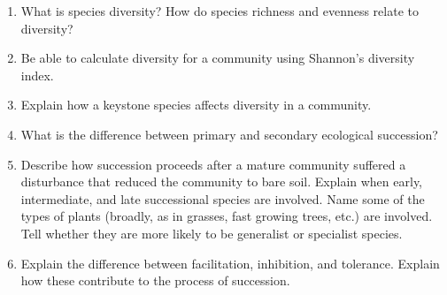 \documentclass[letterpaper]{tufte-handout}
\begin{document}
\begin{enumerate}

	\item What is species diversity? How do species richness and evenness relate to diversity?
	
	\item Be able to calculate diversity for a community using Shannon's diversity index. 
	
	\item Explain how a keystone species affects diversity in a community.
	
	\item What is the difference between primary and secondary ecological succession?
	
	\item Describe how succession proceeds after a mature community suffered a disturbance that reduced the community to bare soil. Explain when early, intermediate, and late successional species are involved. Name some of the types of plants (broadly, as in grasses, fast growing trees, etc.) are involved. Tell whether they are more likely to be generalist or specialist species.
	
	\item Explain the difference between facilitation, inhibition, and tolerance. Explain how these contribute to the process of succession.

\end{enumerate}
\end{document}
